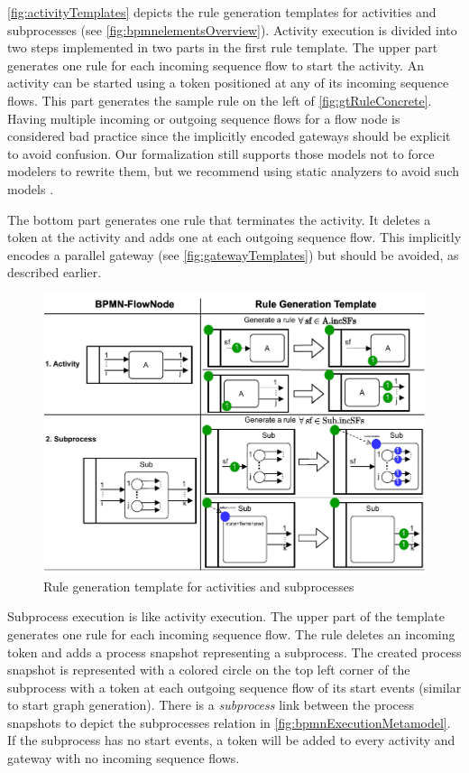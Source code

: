 \documentclass{lmcs} %
\begin{document}
\autoref{fig:activityTemplates} depicts the rule generation templates for activities and subprocesses (see \autoref{fig:bpmnelementsOverview}).
Activity execution is divided into two steps implemented in two parts in the first rule template.
The upper part generates one rule for each incoming sequence flow to start the activity.
An activity can be started using a token positioned at any of its incoming sequence flows.
This part generates the sample rule on the left of \autoref{fig:gtRuleConcrete}.
Having multiple incoming or outgoing sequence flows for a flow node is considered bad practice since the implicitly encoded gateways should be explicit to avoid confusion.
Our formalization still supports those models not to force modelers to rewrite them, but we recommend using static analyzers to avoid such models \cite{camundaservicesgmbhBpmnlint2023}.

The bottom part generates one rule that terminates the activity.
It deletes a token at the activity and adds one at each outgoing sequence flow.
This implicitly encodes a parallel gateway (see \autoref{fig:gatewayTemplates}) but should be avoided, as described earlier. 

\begin{figure}[ht]
    \centering
    \includegraphics[width=1\textwidth]{images/activities_template.pdf}
    \caption{Rule generation template for activities and subprocesses}
    \label{fig:activityTemplates}
\end{figure}

Subprocess execution is like activity execution.
The upper part of the template generates one rule for each incoming sequence flow.
The rule deletes an incoming token and adds a process snapshot representing a subprocess. 
The created process snapshot is represented with a colored circle on the top left corner of the subprocess with a token at each outgoing sequence flow of its start events (similar to start graph generation).
There is a \textit{subprocess} link between the process snapshots to depict the \textsf{subprocesses} relation in \autoref{fig:bpmnExecutionMetamodel}.
If the subprocess has no start events, a token will be added to every activity and gateway with no incoming sequence flows.
\end{document}
